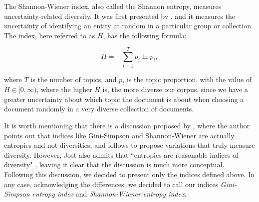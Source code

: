 The Shannon-Wiener index, also called the Shannon entropy, measures uncertainty-related diversity. It was first presented by \cite{shannon_mathematical_1948}, and it measures the uncertainty of identifying an entity at random in a particular group or collection. The index, here referred to as $H$, has the following formula:

\begin{equation}
H = - \sum^{T}_{i = 1} p_{i} \ln{p_{i}},
\label{h_entropy}
\end{equation}

\noindent where $T$ is the number of topics, and $p_{i}$ is the topic proportion, with the value of $H \in [0, \infty)$, where the higher $H$ is, the more diverse our corpus, since we have a greater uncertainty about which topic the document is about when choosing a document randomly in a very diverse collection of documents.

It is worth mentioning that there is a discussion proposed by \cite{jost_entropy_2006}, where the author points out that indices like Gini-Simpson and Shannon-Wiener are actually entropies and not diversities, and follows to propose variations that truly measure diversity. However, Jost also admits that ``entropies are reasonable indices of diversity" \citep[p. 363]{jost_entropy_2006}, leaving it clear that the discussion is much more conceptual. Following this discussion, we decided to present only the indices defined above. In any case, acknowledging the differences, we decided to call our indices \textit{Gini-Simpson entropy index} and \textit{Shannon-Wiener entropy index}.
